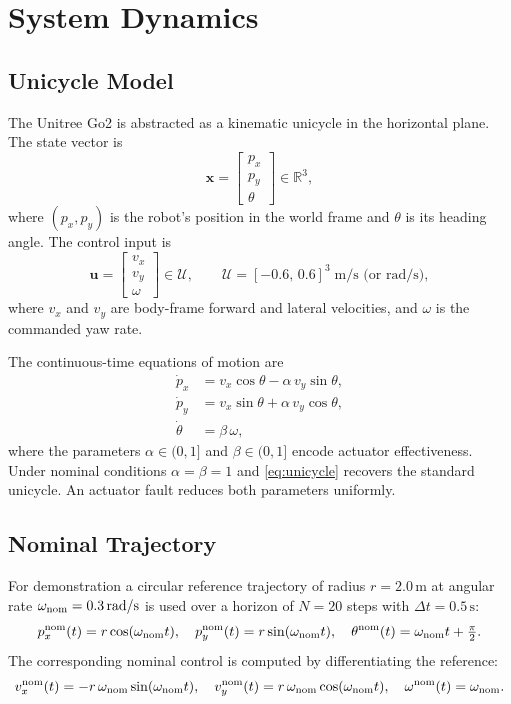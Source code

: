 \documentclass[11pt]{article}
\newcommand{\xvec}{\mathbf{x}}
\newcommand{\uvec}{\mathbf{u}}
\newcommand{\R}{\mathbb{R}}
\begin{document}
\section{System Dynamics}

\subsection{Unicycle Model}

The Unitree Go2 is abstracted as a kinematic unicycle in the horizontal plane.
The state vector is
\[
  \xvec = \begin{bmatrix} p_x \\ p_y \\ \theta \end{bmatrix} \in \R^3,
\]
where $(p_x, p_y)$ is the robot's position in the world frame and $\theta$ is
its heading angle. The control input is
\[
  \uvec = \begin{bmatrix} v_x \\ v_y \\ \omega \end{bmatrix} \in \mathcal{U},
  \qquad
  \mathcal{U} = [-0.6,\,0.6]^3\;\text{m/s (or rad/s)},
\]
where $v_x$ and $v_y$ are body-frame forward and lateral velocities, and
$\omega$ is the commanded yaw rate.

The continuous-time equations of motion are
\begin{equation}
  \label{eq:unicycle}
  \begin{aligned}
    \dot{p}_x &= v_x \cos\theta - \alpha\, v_y \sin\theta, \\
    \dot{p}_y &= v_x \sin\theta + \alpha\, v_y \cos\theta, \\
    \dot{\theta} &= \beta\,\omega,
  \end{aligned}
\end{equation}
where the parameters $\alpha \in (0,1]$ and $\beta \in (0,1]$ encode actuator
effectiveness. Under nominal conditions $\alpha = \beta = 1$ and
\eqref{eq:unicycle} recovers the standard unicycle. An actuator fault reduces
both parameters uniformly.

\subsection{Nominal Trajectory}

For demonstration a circular reference trajectory of radius $r = 2.0\,\text{m}$
at angular rate $\omega_{\rm nom} = 0.3\,\text{rad/s}$ is used over a horizon
of $N = 20$ steps with $\Delta t = 0.5\,\text{s}$:
\[
  p_x^{\rm nom}(t) = r\cos(\omega_{\rm nom} t),
  \quad
  p_y^{\rm nom}(t) = r\sin(\omega_{\rm nom} t),
  \quad
  \theta^{\rm nom}(t) = \omega_{\rm nom} t + \tfrac{\pi}{2}.
\]
The corresponding nominal control is computed by differentiating the reference:
\[
  v_x^{\rm nom}(t) = -r\,\omega_{\rm nom}\sin(\omega_{\rm nom} t),
  \quad
  v_y^{\rm nom}(t) = r\,\omega_{\rm nom}\cos(\omega_{\rm nom} t),
  \quad
  \omega^{\rm nom}(t) = \omega_{\rm nom}.
\]
\end{document}
